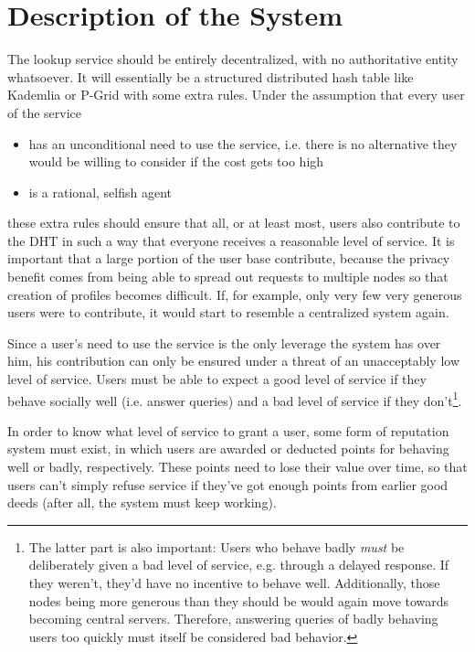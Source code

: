 \documentclass[10pt]{article}
\begin{document}
\section*{Description of the System}
The lookup service should be entirely decentralized, with no authoritative
entity whatsoever. It will essentially be a structured distributed hash table
like Kademlia\cite{maymounkov2002kademlia} or P-Grid\cite{aberer2003p} with some
extra rules. Under the assumption that every user of the service
\begin{itemize}
\item has an unconditional need to use the service, i.e. there is no alternative
they would be willing to consider if the cost gets too high
\item is a rational, selfish agent
\end{itemize}
these extra rules should ensure that all, or at least most, users also
contribute to the DHT in such a way that everyone receives a reasonable level of
service. It is important that a large portion of the user base contribute,
because the privacy benefit comes from being able to spread out requests to
multiple nodes so that creation of profiles becomes difficult. If, for example,
only very few very generous users were to contribute, it would start to resemble
a centralized system again.

Since a user's need to use the service is the only leverage the system has over
him, his contribution can only be ensured under a threat of an unacceptably low
level of service. Users must be able to expect a good level of service if they
behave socially well (i.e. answer queries) and a bad level of service if they
don't\footnote{The latter part is also important: Users who behave badly
\emph{must} be deliberately given a bad level of service, e.g. through a delayed
response. If they weren't, they'd have no incentive to behave well.
Additionally, those nodes being more generous than they should be would again
move towards becoming central servers. Therefore, answering queries of badly
behaving users too quickly must itself be considered bad behavior.}.

In order to know what level of service to grant a user, some form of reputation
system must exist, in which users are awarded or deducted points for behaving
well or badly, respectively. These points need to lose their value over time, so
that users can't simply refuse service if they've got enough points from earlier
good deeds (after all, the system must keep working).
\end{document}
